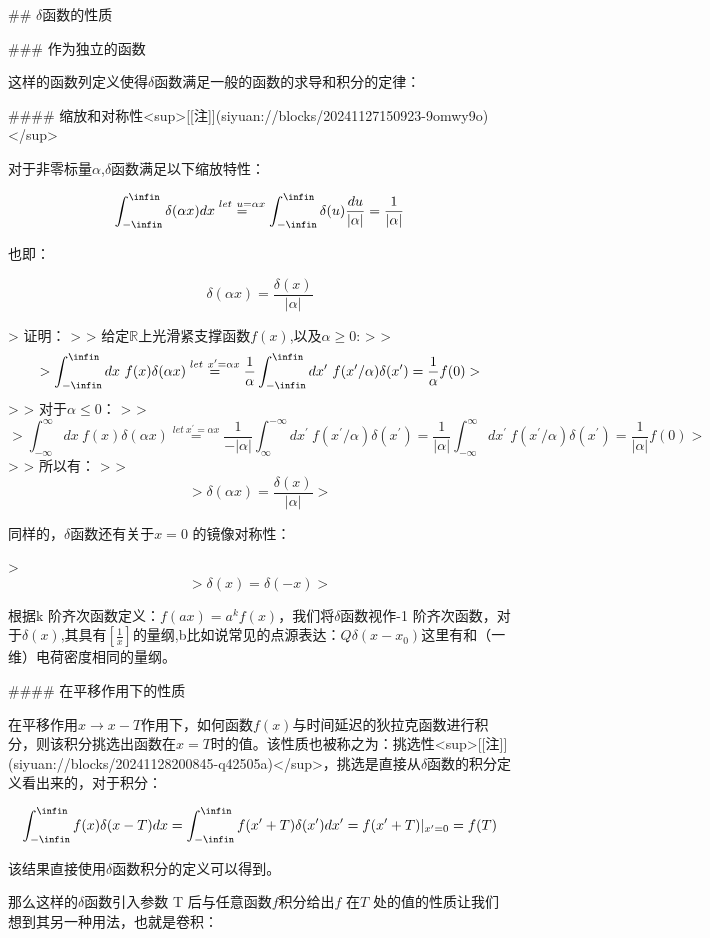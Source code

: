 \documentclass[lang=cn,10pt,newtx,bibend=biber,device=pad]{elegantbook}
\begin{document}
## $\delta$函数的性质

### 作为独立的函数

这样的函数列定义使得$\delta$函数满足一般的函数的求导和积分的定律：

#### 缩放和对称性<sup>[[注]](siyuan://blocks/20241127150923-9omwy9o)</sup>

对于非零标量$\alpha$,$\delta$函数满足以下缩放特性：

$$
\int_{-\infin}^{\infin}\delta(\alpha x)dx \overset{let \ u=\alpha x}{=} \int_{-\infin}^{\infin}\delta(u)\frac{du}{|\alpha|} = \frac{1}{|\alpha|}
$$

也即：

$$
\delta(\alpha x) =\frac{\delta(x)}{|\alpha|}
$$

> 证明：
>
> 给定$\mathbb{R}$上光滑紧支撑函数$f(x)$,以及$\alpha\ge 0$:
>
> $$
> \int_{-\infin}^{\infin} dx\ f(x)\delta(\alpha x) \overset{let \ x'=\alpha x}{=}\frac{1}{\alpha}\int_{-\infin}^{\infin} dx'\ f(x'/\alpha)\delta(x') = \frac{1}{\alpha}f(0)
> $$
>
> 对于$\alpha\le0$：
>
> $$
> \int_{-\infty}^{\infty}dx\ f(x)\delta(\alpha x)\overset{let\ x^{\prime}=\alpha x}{=}\frac{1}{-|\alpha|}\int_{\infty}^{-\infty}dx^{\prime}\ f(x^{\prime}/\alpha)\delta(x^{\prime})=\frac{1}{|\alpha|}\int_{-\infty}^{\infty}dx^{\prime}\ f(x^{\prime}/\alpha)\delta(x^{\prime})=\frac{1}{|\alpha|}f(0)
> $$
>
> 所以有：
>
> $$
> \delta(\alpha x) = \frac{\delta(x)}{|\alpha|}
> $$

同样的，$\delta$函数还有关于$x=0$ 的镜像对称性：

> $$
> \delta(x) = \delta(-x)
> $$

根据k 阶齐次函数定义：$f(ax) = a^k f(x)$，我们将$\delta$函数视作-1 阶齐次函数，对于$\delta(x)$,其具有$[\frac{1}{x}]$的量纲,b比如说常见的点源表达：$Q\delta(x-x_0)$这里有和（一维）电荷密度相同的量纲。

#### 在平移作用下的性质

在平移作用$x\rightarrow x-T$作用下，如何函数$f(x)$与时间延迟的狄拉克函数进行积分，则该积分挑选出函数在$x=T$时的值。该性质也被称之为：挑选性<sup>[[注]](siyuan://blocks/20241128200845-q42505a)</sup>，挑选是直接从$\delta$函数的积分定义看出来的，对于积分：

$$
\int_{-\infin}^\infin f(x)\delta(x-T)dx=\int_{-\infin}^\infin f(x'+T)\delta(x')dx' = f(x'+T)|_{x'=0}=f(T)
$$

该结果直接使用$\delta$函数积分的定义可以得到。

那么这样的$\delta$函数引入参数 T 后与任意函数$f$积分给出$f$ 在$T$ 处的值的性质让我们想到其另一种用法，也就是卷积：
\end{document}
